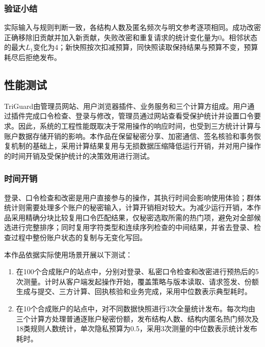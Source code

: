 \documentclass{crypto_report}
\begin{document}
\subsubsection{验证小结}\label{sec:validation-privacy-5}

实际输入与规则判断一致，各结构人数及匿名频次与明文参考逐项相同。成功改密正确移除旧贡献并加入新贡献，失败改密和重复请求的统计变化量为0。相邻状态的最大$L_1$变化为4；新快照按次扣减预算，同快照读取保持结果与预算不变，预算耗尽后拒绝发布。


\subsection{性能测试}\label{sec:performance}

TriGuard由管理员网站、用户浏览器插件、业务服务和三个计算方组成。用户通过插件完成口令检查、登录与修改，管理员通过网站查看受保护统计并设置口令要求。因此，系统的工程性能既取决于常用操作的响应时间，也受到三方统计计算与账户数据存储开销的影响。本作品在保留秘密分享、加密通信、签名核验和事务恢复机制的基础上，采用计算结果复用与无损数据压缩降低运行开销，并对用户操作的时间开销及受保护统计的决策效用进行测试。

\subsubsection{时间开销}\label{sec:performance-time}

登录、口令检查和改密是用户直接参与的操作，其执行时间会影响使用体验；群体统计则需要处理多个账户的秘密输入，计算开销相对较大。为减少运行开销，本作品采用精确分块比较复用口令匹配结果，仅秘密选取所需的热门项，避免对全部候选进行完整排序；同时复用字符类型和连续序列检查的中间结果，并省去登录、检查过程中整份账户状态的复制与无变化写回。

本作品依据实际使用场景开展以下测试：

\begin{enumerate}
\item 在100个合成账户的站点中，分别对登录、私密口令检查和改密进行预热后的5次测量。计时从客户端发起操作开始，覆盖策略与版本读取、请求签发、份额生成与提交、三方计算、回执核验和业务完成，采用中位数表示典型耗时。
\item 在10个合成账户的站点中，对不同数据快照进行3次全量统计发布。每次均由三个计算方处理普通逐账户秘密份额，发布结构人数、结构内匿名热门频次及18类规则人数统计，单次隐私预算为0.5，采用3次测量的中位数表示统计发布耗时。
\end{enumerate}
\end{document}
